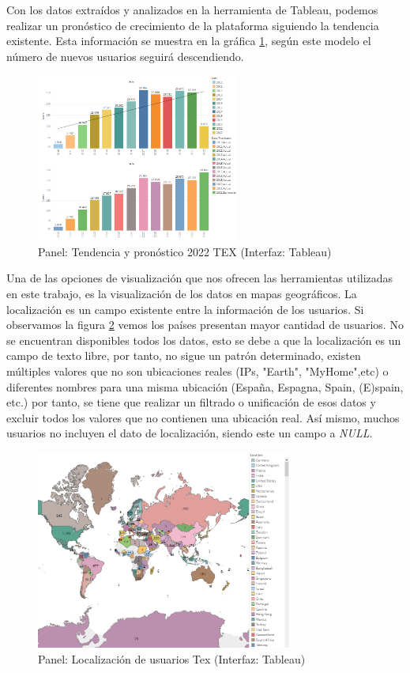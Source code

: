 \documentclass[a4paper, 12pt]{book}
\begin{document}
Con los datos extraídos y analizados en la herramienta de Tableau, podemos realizar un pronóstico de crecimiento de la plataforma siguiendo la tendencia existente. Esta información se muestra en la gráfica \ref{figura:tendencia_tex}, según este modelo el número de nuevos usuarios seguirá descendiendo.

\begin{figure}[ht]
    \centering
    \includegraphics[width=0.6\textwidth]{img/tex/Tendencia_pronostico_TEX.png}
    \caption{Panel: Tendencia y pronóstico 2022 TEX (Interfaz: Tableau)}
    \label{figura:tendencia_tex}
\end{figure}

Una de las opciones de visualización que nos ofrecen las herramientas utilizadas en este trabajo, es la visualización de los datos en mapas geográficos. La localización es un campo existente entre la información de los usuarios. Si observamos la figura \ref{figura:MAP_users_tex} vemos los países presentan mayor cantidad de usuarios. No se encuentran disponibles todos los datos, esto se debe a que la localización es un campo de texto libre, por tanto, no sigue un patrón determinado, existen múltiples valores que no son ubicaciones reales (IPs, "Earth", "MyHome",etc) o diferentes nombres para una misma ubicación (España, Espagna, Spain, (E)spain, etc.) por tanto, se tiene que realizar un filtrado o unificación de esos datos y excluir todos los valores que no contienen una ubicación real. Así mismo, muchos usuarios no incluyen el dato de localización, siendo este un campo a \emph{NULL}. 

\begin{figure}[ht]
    \centering
    \includegraphics[width=0.75\textwidth]{img/tex/Maps_tex.png}
    \caption{Panel: Localización de usuarios Tex (Interfaz: Tableau)}
    \label{figura:MAP_users_tex}
\end{figure}
\end{document}
